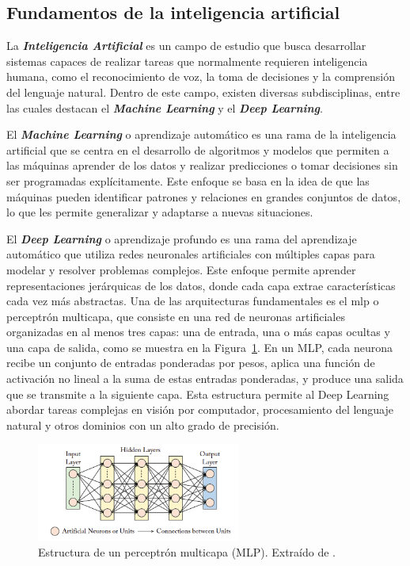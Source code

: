 \documentclass[11pt,spanish,listoffigures,listoftables]{tfgetsinf}
\begin{document}
\subsection{Fundamentos de la inteligencia artificial} \label{sec:fundamentos_inteligencia_artificial}
La \textit{\textbf{Inteligencia Artificial}} es un campo de estudio que busca desarrollar sistemas capaces de realizar tareas que normalmente requieren inteligencia humana, como el reconocimiento de voz, la toma de decisiones y la comprensión del lenguaje natural. Dentro de este campo, existen diversas subdisciplinas, entre las cuales destacan el \textit{\textbf{Machine Learning}} y el \textit{\textbf{Deep Learning}}.

El \textit{\textbf{Machine Learning}} o aprendizaje automático es una rama de la inteligencia artificial que se centra en el desarrollo de algoritmos y modelos que permiten a las máquinas aprender de los datos y realizar predicciones o tomar decisiones sin ser programadas explícitamente. Este enfoque se basa en la idea de que las máquinas pueden identificar patrones y relaciones en grandes conjuntos de datos, lo que les permite generalizar y adaptarse a nuevas situaciones.

El \textit{\textbf{Deep Learning}} o aprendizaje profundo es una rama del aprendizaje automático que utiliza redes neuronales artificiales con múltiples capas para modelar y resolver problemas complejos. Este enfoque permite aprender representaciones jerárquicas de los datos, donde cada capa extrae características cada vez más abstractas. Una de las arquitecturas fundamentales es el \gls{mlp} o perceptrón multicapa, que consiste en una red de neuronas artificiales organizadas en al menos tres capas: una de entrada, una o más capas ocultas y una capa de salida, como se muestra en la Figura~\ref{fig:multilayer_perceptron}. En un MLP, cada neurona recibe un conjunto de entradas ponderadas por pesos, aplica una función de activación no lineal a la suma de estas entradas ponderadas, y produce una salida que se transmite a la siguiente capa. Esta estructura permite al Deep Learning abordar tareas complejas en visión por computador, procesamiento del lenguaje natural y otros dominios con un alto grado de precisión.


\begin{figure}[H]
   \centering
   \includegraphics[width=0.6\textwidth]{images/estado_del_arte/multilayer_perceptron.png}
      \caption[Estructura de un perceptrón multicapa (MLP)]{Estructura de un perceptrón multicapa (MLP). Extraído de \cite[fig. 3.1, p.~32]{khan2018guide}.}
   \label{fig:multilayer_perceptron}
\end{figure}
\end{document}
